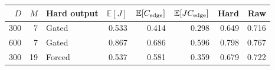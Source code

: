 \begin{tabular}{rrlrrrrr}
\toprule
$D$ & $M$ & Hard output & $\mathbb E[J]$ & $\mathbb E[C_{\rm edge}]$ & $\mathbb E[JC_{\rm edge}]$ & Hard & Raw \\
\midrule
300 & 7 & Gated & 0.533 & 0.414 & 0.298 & 0.649 & 0.716 \\
600 & 7 & Gated & 0.867 & 0.686 & 0.596 & 0.798 & 0.767 \\
300 & 19 & Forced & 0.537 & 0.581 & 0.359 & 0.679 & 0.722 \\
\bottomrule
\end{tabular}
